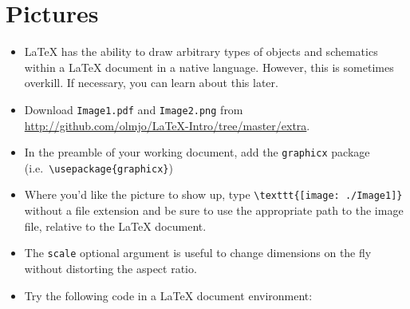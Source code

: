 \section{Pictures}

\begin{itemize}

\item \LaTeX{} has the ability to draw arbitrary types of objects and schematics
  within a \LaTeX{} document in a native language. However, this is sometimes
  overkill. If necessary, you can learn about this later.

\item Download \texttt{Image1.pdf} and \texttt{Image2.png} from
  \url{http://github.com/olmjo/LaTeX-Intro/tree/master/extra}.

\item In the preamble of your working document, add the \texttt{graphicx}
  package (i.e.\ \verb!\usepackage{graphicx}!)

\item Where you'd like the picture to show up, type
  \verb!\texttt{[image: ./Image1]}! without a file extension and be
  sure to use the appropriate path to the image file, relative to the
  \LaTeX{} document.

\item The \verb!scale! optional argument is useful to change dimensions on the
  fly without distorting the aspect ratio.

\item Try the following code in a \LaTeX{} document environment:


\end{itemize}
